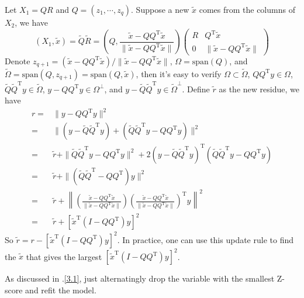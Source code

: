 \begin{sol}
Let $X_1=QR$ and $Q=(z_1,\cdots,z_q)$. Suppose a new $\tilde{x}$ comes from the columns of $X_2$, we have
\[
(X_1, \tilde{x})=\tilde{Q}\tilde{R}=\left(Q,\frac{\tilde{x}-QQ^\mathrm{T}\tilde{x}}{\|\tilde{x}-QQ^\mathrm{T}\tilde{x}\|}\right)
\begin{pmatrix}
R & Q^\mathrm{T}\tilde{x}\\
0 & \|\tilde{x}-QQ^\mathrm{T}\tilde{x}\|
\end{pmatrix}
\]
Denote $z_{q+1}=(\tilde{x}-QQ^\mathrm{T}\tilde{x})/\|\tilde{x}-QQ^\mathrm{T}\tilde{x}\|$, $\Omega=\mathrm{span}(Q)$, and $\tilde{\Omega}=\mathrm{span}(Q,z_{q+1})=\mathrm{span}(Q,\tilde{x})$, then it's easy to verify
$\Omega\subset\tilde{\Omega}$, $QQ^\mathrm{T}y\in \Omega$, $\tilde{Q}\tilde{Q}^\mathrm{T}y\in \tilde{\Omega}$, $y-QQ^\mathrm{T}y\in \Omega^\perp$, and $y-\tilde{Q}\tilde{Q}^\mathrm{T}y\in \tilde{\Omega}^\perp$. Define $\tilde{r}$ as the new residue, we have
\begin{align*}
r =& \|y-QQ^\mathrm{T}y\|^2\\
=& \|(y-\tilde{Q}\tilde{Q}^\mathrm{T}y)+(\tilde{Q}\tilde{Q}^\mathrm{T}y-QQ^\mathrm{T}y)\|^2\\
=& \tilde{r} + \|\tilde{Q}\tilde{Q}^\mathrm{T}y-QQ^\mathrm{T}y\|^2 + 2(y-\tilde{Q}\tilde{Q}^\mathrm{T}y)^\mathrm{T}(\tilde{Q}\tilde{Q}^\mathrm{T}y-QQ^\mathrm{T}y)\\
=& \tilde{r} + \|(\tilde{Q}\tilde{Q}^\mathrm{T}-QQ^\mathrm{T})y\|^2\\
=& \tilde{r} + \left\|\left(\frac{\tilde{x}-QQ^\mathrm{T}\tilde{x}}{\|\tilde{x}-QQ^\mathrm{T}\tilde{x}\|}\right)\left(\frac{\tilde{x}-QQ^\mathrm{T}\tilde{x}}{\|\tilde{x}-QQ^\mathrm{T}\tilde{x}\|}\right)^\mathrm{T}y\right\|^2\\
=& \tilde{r} + \left[\tilde{x}^\mathrm{T}(I-QQ^\mathrm{T})y\right]^2
\end{align*}
So $\tilde{r}=r-[\tilde{x}^\mathrm{T}(I-QQ^\mathrm{T})y]^2$. In practice, one can use this update rule to find the $\tilde{x}$ that gives the largest $\left[\tilde{x}^\mathrm{T}(I-QQ^\mathrm{T})y\right]^2$.
\end{sol}

\begin{sol}
As discussed in \thesection.\ref{3.1}, just alternatingly drop the variable with the smallest Z-score and refit the model.
\end{sol}

